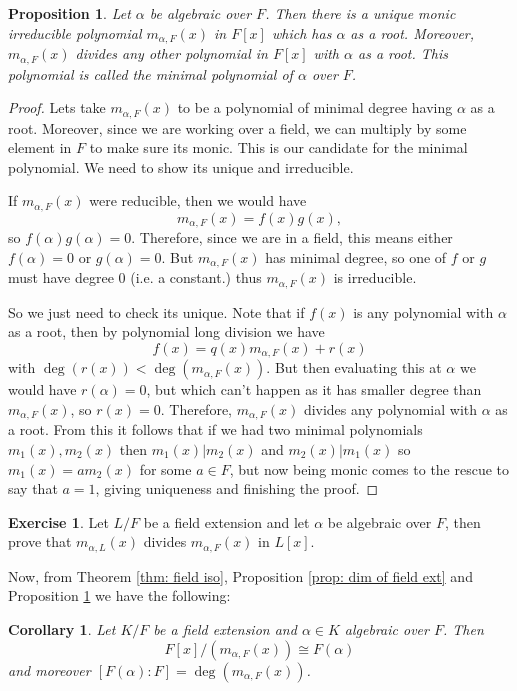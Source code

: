 \documentclass[11pt,a4paper]{report}
\theoremstyle{plain}
\newtheorem{corollary}[subsection]{Corollary}
\newtheorem{prop}[subsection]{Proposition}
\theoremstyle{definition}
\theoremstyle{definition}
\newtheorem{question}[subsection]{Exercise}
\def \a{\alpha}
\begin{document}
	\begin{prop}\label{prop: min pol}
		Let $\a$ be algebraic over $F$. Then there is a unique monic irreducible polynomial $m_{\a,F}(x)$ in $F[x]$ which has $\a$ as a root. Moreover, $m_{\a,F}(x)$ divides any other polynomial in $F[x]$ with $\a$ as a root.  This polynomial is called the minimal polynomial of $\a$ over $F$.
	\end{prop}
	
	
	\begin{proof}
		Lets take $m_{\a,F}(x)$ to be a polynomial of minimal degree having $\a$ as a root. Moreover, since we are working over a field, we can multiply by some element in $F$ to make sure its monic. This is our candidate for the minimal polynomial. We need to show its unique and irreducible.
		
		If $m_{\a,F}(x)$ were reducible, then we would have \[m_{\a,F}(x)=f(x)g(x),\] so $f(\a)g(\a)=0$. Therefore, since we are in a field, this means either $f(\a)=0$ or $g(\a)=0$. But $m_{\a,F}(x)$ has minimal degree, so one of $f$ or $g$ must have degree $0$ (i.e. a constant.) thus $m_{\a,F}(x)$ is irreducible.
		
		So we just need to check its unique. Note that if $f(x)$ is any polynomial with $\a$ as a root, then by polynomial long division we have \[f(x)=q(x)m_{\a,F}(x)+r(x)\] with $\deg(r(x))< \deg(m_{\a,F}(x))$. But then evaluating this at $\a$ we would have $r(\a)=0$, but which can't happen as it has smaller degree than $m_{\a,F}(x)$, so $r(x)=0$. Therefore, $m_{\a,F}(x)$ divides any polynomial with $\a$ as a root. From this it follows that if we had two minimal polynomials $m_1(x),m_2(x)$ then $m_1(x)|m_2(x)$ and $m_2(x)|m_1(x)$ so $m_1(x)=a m_2(x)$ for some $a \in F$, but now being monic comes to the rescue to say that $a=1$, giving uniqueness and finishing the proof.
	\end{proof}
	
	
	
	\begin{question}
		Let $L/F$ be a field extension and let $\a$ be algebraic over  $F$, then prove that $m_{\a,L}(x)$ divides $m_{\a,F}(x)$ in $L[x]$.
	\end{question}
	
	
	
	Now, from Theorem \ref{thm: field iso}, Proposition \ref{prop: dim of field ext} and Proposition \ref{prop: min pol} we have the following:
	
	\begin{corollary}\label{cor: min pol simple ext}
		Let $K/F$ be a field extension and $\a \in K$ algebraic over $F$. Then \[F[x]/(m_{\a,F}(x)) \cong F(\a)\] and moreover $[F(\a):F]=\deg(m_{\a,F}(x))$.
	\end{corollary}
	
\end{document}
